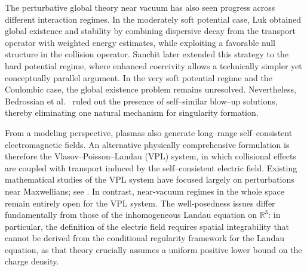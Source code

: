 \documentclass[reqno,11pt,final]{amsart}
\theoremstyle{plain}
\numberwithin{equation}{section}
\numberwithin{theorem}{section}
\begin{document}
The perturbative global theory near vacuum has also seen progress across different interaction regimes. In the moderately soft potential case, Luk \cite{IHL_Luk_2019} obtained global existence and stability by combining dispersive decay from the transport operator with weighted energy estimates, while exploiting a favorable null structure in the collision operator. Sanchit \cite{IHL_Sanchit_2020} later extended this strategy to the hard potential regime, where enhanced coercivity allows a technically simpler yet conceptually parallel argument. In the very soft potential regime and the Coulombic case, the global existence problem remains unresolved. Nevertheless, Bedrossian et al.~\cite{VPL_Bedrossian_2022} ruled out the presence of self--similar blow--up solutions, thereby eliminating one natural mechanism for singularity formation.

From a modeling perspective, plasmas also generate long--range self--consistent electromagnetic fields. An alternative physically comprehensive formulation is therefore the Vlasov--Poisson--Landau (VPL) system, in which collisional effects are coupled with transport induced by the self--consistent electric field. Existing mathematical studies of the VPL system have focused largely on perturbations near Maxwellians; see \cite{VPL_Yu_2004, VPL_Guo_2012, VPL_Strain_2012, VPL_Wang_2012}. In contrast, near-vacuum regimes in the whole space remain entirely open for the VPL system. The well-posedness issues differ fundamentally from those of the inhomogeneous Landau equation on $\mathbb{R}^3$: in particular, the definition of the electric field requires spatial integrability that cannot be derived from the conditional regularity framework for the Landau equation, as that theory crucially assumes a uniform positive lower bound on the charge density.
\end{document}

